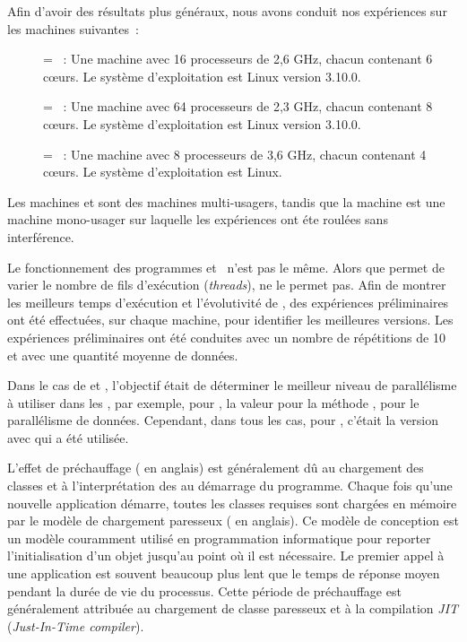 \goodbreak
\begin{samepage}
Afin d'avoir des r\'esultats plus g\'en\'eraux, nous avons conduit nos exp\'eriences sur les machines suivantes~:
\label{machines.sect}


\begin{description}
\item[] = ~: Une machine avec 16 processeurs de 2,6 GHz, chacun contenant 6 cœurs. Le syst\`eme d'exploitation est Linux version 3.10.0. 


\item[] = ~:  Une machine avec 64 processeurs de 2,3 GHz, chacun contenant 8 cœurs. Le système d'exploitation est Linux version 3.10.0.

\item[] = ~:  Une machine avec 8 processeurs de 3,6 GHz, chacun contenant 4 cœurs. Le système d'exploitation est Linux.


\end{description}
\end{samepage}

Les machines  et  sont des machines multi-usagers, tandis que la machine  est une machine mono-usager sur laquelle les exp\'eriences ont \'et\/e roul\'ees sans interf\'erence.

Le fonctionnement des programmes  et~ n'est pas le m\^eme. Alors que  permet de varier le nombre de fils d'ex\'ecution (\emph{threads}),  ne le permet pas. Afin de montrer les meilleurs temps d'ex\'ecution et l'\'evolutivit\'e de , des exp\'eriences pr\'eliminaires ont \'et\'e effectu\'ees, sur chaque machine, pour identifier les meilleures versions. Les exp\'eriences pr\'eliminaires ont \'et\'e conduites avec un nombre de r\'ep\'etitions de 10 et avec une quantit\'e moyenne de donn\'ees. 

Dans le cas de  et , l'objectif \'etait de d\'eterminer le meilleur niveau de parall\'elisme \`a utiliser dans les , par exemple, pour , la valeur pour la m\'ethode , pour le parall\'elisme de donn\'ees. Cependant, dans tous les cas, pour , c'\'etait la version avec  qui a \'et\'e utilis\'ee.

L'effet de pr\'echauffage ( en anglais) est g\'en\'eralement d\^u au chargement des classes et \`a l'interpr\'etation des  au d\'emarrage du programme. Chaque fois qu'une nouvelle application d\'emarre, toutes les classes requises sont charg\'ees en m\'emoire par le mod\`ele de chargement paresseux ( en anglais). Ce mod\`ele de conception est un mod\`ele couramment utilis\'e en programmation informatique pour reporter l'initialisation d'un objet jusqu'au point o\`u il est n\'ecessaire. Le premier appel \`a une application  est souvent beaucoup plus lent que le temps de r\'eponse moyen pendant la dur\'ee de vie du processus. Cette p\'eriode de pr\'echauffage est g\'en\'eralement attribu\'ee au chargement de classe paresseux et à la compilation \emph{JIT} (\emph{Just-In-Time compiler}).    

